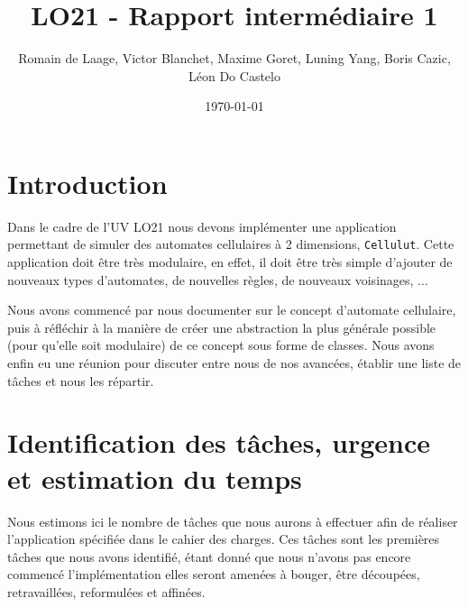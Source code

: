 \documentclass[11pt]{article}
\title{LO21 - Rapport intermédiaire 1}
\author{Romain de Laage, Victor Blanchet, Maxime Goret, Luning Yang, Boris Cazic, Léon Do Castelo}
\date{\today}
\begin{document}
\maketitle
\thispagestyle{fancy}

\section{Introduction}

Dans le cadre de l'UV LO21 nous devons implémenter une application permettant de simuler des automates cellulaires à 2 dimensions, \texttt{Cellulut}. Cette application doit être très modulaire, en effet, il doit être très simple d'ajouter de nouveaux types d'automates, de nouvelles règles, de nouveaux voisinages, ...

\medskip

Nous avons commencé par nous documenter sur le concept d'automate cellulaire, puis à réfléchir à la manière de créer une abstraction la plus générale possible (pour qu'elle soit modulaire) de ce concept sous forme de classes. Nous avons enfin eu une réunion pour discuter entre nous de nos avancées, établir une liste de tâches et nous les répartir.

\section{Identification des tâches, urgence et estimation du temps}

Nous estimons ici le nombre de tâches que nous aurons à effectuer afin de réaliser l'application spécifiée dans le cahier des charges. Ces tâches sont les premières tâches que nous avons identifié, étant donné que nous n'avons pas encore commencé l'implémentation elles seront amenées à bouger, être découpées, retravaillées, reformulées et affinées.

\bigskip
\end{document}
